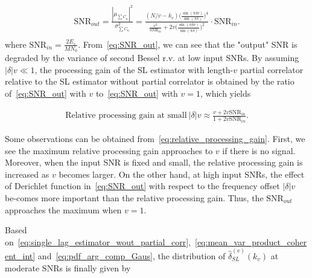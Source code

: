 \begin{equation}
  \begin{aligned}
    \label{eq:SNR_out}
    \text{SNR}_{out}=\frac{|\mu_{\sum C_{\digamma_l}}|^2}{\sigma^2_{\sum C_{\digamma_l}}} 
    =\frac{(N/v-k_v)\Big(\frac{\sin(\pi \delta v)}{\sin(\pi \delta)}\Big)^4}
    {\frac{v^2}{\text{SNR}_{in}}+2v\Big(\frac{\sin(\pi \delta v)}{\sin(\pi \delta)}\Big)^2}\cdot\text{SNR}_{in}. \\
  \end{aligned}
\end{equation}
where $\text{SNR}_{in}=\frac{2E_s}{MN_0}$. From~\eqref{eq:SNR_out},
we can see that the "output" SNR is degraded by the variance of second
Bessel r.v. at low input SNRs. By assuming $|\delta|v{\ll} 1$, the processing gain
of the SL estimator with length-$v$ partial correlator relative to the SL estimator
without partial correlator is obtained by the ratio of~\eqref{eq:SNR_out} 
with $v$ to~\eqref{eq:SNR_out} with $v=1$, which yields 

\begin{equation}
  \begin{aligned}
    \label{eq:relative_processing_gain}
    \text{Relative processing gain at small}~|\delta|v \approx\frac{v+2v\text{SNR}_{in}}{1+2v\text{SNR}_{in}}.
  \end{aligned}
\end{equation}

Some observations can be obtained from~\eqref{eq:relative_processing_gain}.
First, we see the maximum relative processing gain approaches to $v$ if there is no signal. 
Moreover, when the input SNR is fixed and small, the relative processing gain
is increased as $v$ becomes larger. On the other hand, at high input SNRs,
the effect of Derichlet function in~\eqref{eq:SNR_out} with respect to the frequency offset
$|\delta|v$ be-comes more important than the relative processing gain.
Thus, the $\text{SNR}_{out}$ approaches the maximum when $v=1$.

Based on~\eqref{eq:single_lag_estimator_wout_partial_corr},~\eqref{eq:mean_var_product_coherent_int}
and~\eqref{eq:pdf_arg_comp_Gaus}, the distribution of $\hat{\delta}_{SL}^{(v)}(k_v)$ at moderate SNRs is finally given by

